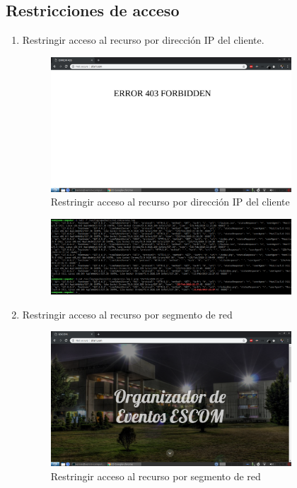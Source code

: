 \subsection{Restricciones de acceso}
	\begin{enumerate}
		\item Restringir acceso al recurso por dirección IP del cliente.
			\begin{figure}[htbp]
				\centering
				\includegraphics[width=9cm]{./img/lista/3.png}
				\caption[Restringir acceso al recurso por dirección IP del cliente]{Restringir acceso al recurso por dirección IP del cliente}
				\label{fig:3}
			\end{figure}
			\begin{figure}[htbp]
			\centering
				\includegraphics[width=9cm]{./img/lista/3_1.png}
				\label{fig:3.1}
			\end{figure}
		\item Restringir acceso al recurso por segmento de red\\
			\begin{figure}[htbp]
				\centering
				\includegraphics[width=9cm]{./img/lista/4.png}
				\caption[Restringir acceso al recurso por segmento de red]{Restringir acceso al recurso por segmento de red}

\end{figure}
\end{enumerate}
